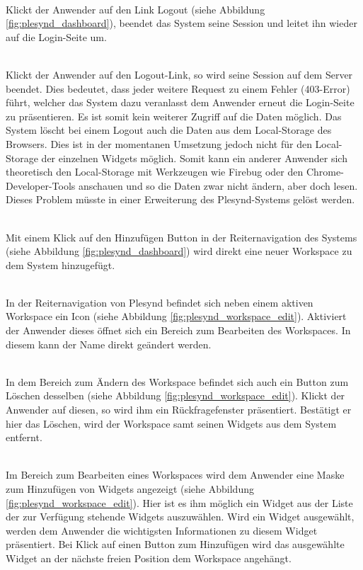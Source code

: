\textbullet{}  \emph{\requirementLogout}\\
Klickt der Anwender auf den Link Logout (siehe Abbildung \ref{fig:plesynd_dashboard}), beendet das System seine Session und leitet ihn wieder auf die Login-Seite um. 

\textbullet{}  \emph{\requirementKeinZugriffNachLogout}\\
Klickt der Anwender auf den Logout-Link, so wird seine Session auf dem Server beendet. Dies bedeutet, dass jeder weitere Request zu einem Fehler (403-Error) führt, welcher das System dazu veranlasst dem Anwender erneut die Login-Seite zu präsentieren. Es ist somit kein weiterer Zugriff auf die Daten möglich. Das System löscht bei einem Logout auch die Daten aus dem Local-Storage des Browsers. Dies ist in der momentanen Umsetzung jedoch nicht für den Local-Storage der einzelnen Widgets möglich. Somit kann ein anderer Anwender sich theoretisch den Local-Storage mit Werkzeugen wie Firebug oder den Chrome-Developer-Tools anschauen und so die Daten zwar nicht ändern, aber doch lesen. Dieses Problem müsste in einer Erweiterung des Plesynd-Systems gelöst werden.

\textbullet{}  \emph{\requirementWorkspaceAdd}\\
Mit einem Klick auf den Hinzufügen Button in der Reiternavigation des Systems (siehe Abbildung \ref{fig:plesynd_dashboard}) wird direkt eine neuer Workspace zu dem System hinzugefügt.

\textbullet{}  \emph{\requirementWorkspaceEdit}\\
In der Reiternavigation von Plesynd befindet sich neben einem aktiven Workspace ein Icon (siehe Abbildung \ref{fig:plesynd_workspace_edit}). Aktiviert der Anwender dieses öffnet sich ein Bereich zum Bearbeiten des Workspaces. In diesem kann der Name direkt geändert werden.

\textbullet{}  \emph{\requirementWorkspaceDelete}\\
In dem Bereich zum Ändern des Workspace befindet sich auch ein Button zum Löschen desselben (siehe Abbildung \ref{fig:plesynd_workspace_edit}). Klickt der Anwender auf diesen, so wird ihm ein Rückfragefenster präsentiert. Bestätigt er hier das Löschen, wird der Workspace samt seinen Widgets aus dem System entfernt. 

\textbullet{}  \emph{\requirementWidgetAdd}\\
Im Bereich zum Bearbeiten eines Workspaces wird dem Anwender eine Maske zum Hinzufügen von Widgets angezeigt (siehe Abbildung \ref{fig:plesynd_workspace_edit}). Hier ist es ihm möglich ein Widget aus der Liste der zur Verfügung stehende Widgets auszuwählen. Wird ein Widget ausgewählt, werden dem Anwender die wichtigsten Informationen zu diesem Widget präsentiert. Bei Klick auf einen Button zum Hinzufügen wird das ausgewählte Widget an der nächste freien Position dem Workspace angehängt.

